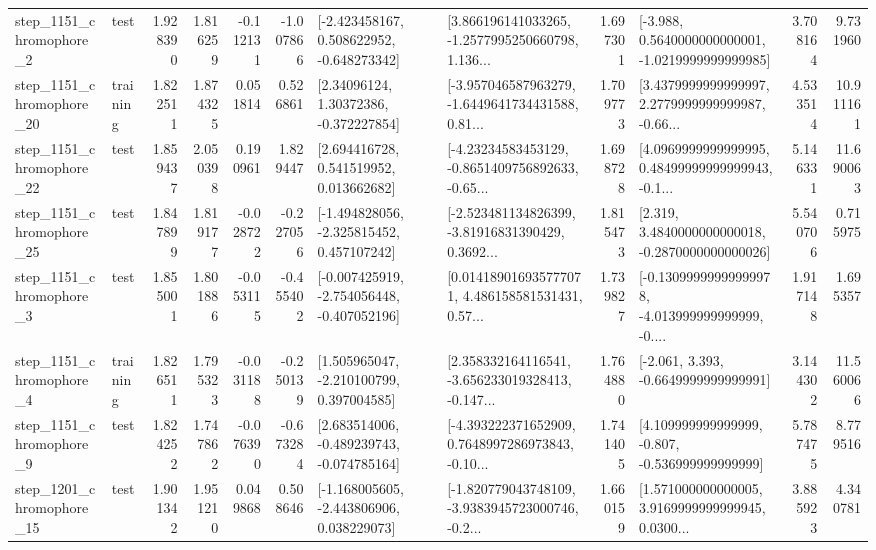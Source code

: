 \begin{tabular}{llrrrrllrlrr}
  step\_1151\_chromophore\_2 &      test &      1.928390 &    1.816259 &     -0.112131 & -1.007866 &   [-2.423458167, 0.508622952, -0.648273342] &  [3.866196141033265, -1.2577995250660798, 1.136... &       1.697301 &  [-3.988, 0.5640000000000001, -1.0219999999999985] &            3.708164 &          9.731960 \\
 step\_1151\_chromophore\_20 &  training &      1.822511 &    1.874325 &      0.051814 &  0.526861 &      [2.34096124, 1.30372386, -0.372227854] &  [-3.957046587963279, -1.6449641734431588, 0.81... &       1.709773 &  [3.4379999999999997, 2.2779999999999987, -0.66... &            4.533514 &         10.911161 \\
 step\_1151\_chromophore\_22 &      test &      1.859437 &    2.050398 &      0.190961 &  1.829447 &     [2.694416728, 0.541519952, 0.013662682] &  [-4.23234583453129, -0.8651409756892633, -0.65... &       1.698728 &  [4.0969999999999995, 0.48499999999999943, -0.1... &            5.146331 &         11.690063 \\
 step\_1151\_chromophore\_25 &      test &      1.847899 &    1.819177 &     -0.028722 & -0.227056 &   [-1.494828056, -2.325815452, 0.457107242] &  [-2.523481134826399, -3.81916831390429, 0.3692... &       1.815473 &   [2.319, 3.4840000000000018, -0.2870000000000026] &            5.540706 &          0.715975 \\
  step\_1151\_chromophore\_3 &      test &      1.855001 &    1.801886 &     -0.053115 & -0.455402 &  [-0.007425919, -2.754056448, -0.407052196] &  [0.014189016935777071, 4.486158581531431, 0.57... &       1.739827 &  [-0.13099999999999978, -4.013999999999999, -0.... &            1.917148 &          1.695357 \\
  step\_1151\_chromophore\_4 &  training &      1.826511 &    1.795323 &     -0.031188 & -0.250139 &    [1.505965047, -2.210100799, 0.397004585] &  [2.358332164116541, -3.656233019328413, -0.147... &       1.764880 &               [-2.061, 3.393, -0.6649999999999991] &            3.144302 &         11.560066 \\
  step\_1151\_chromophore\_9 &      test &      1.824252 &    1.747862 &     -0.076390 & -0.673284 &   [2.683514006, -0.489239743, -0.074785164] &  [-4.393222371652909, 0.7648997286973843, -0.10... &       1.741405 &    [4.109999999999999, -0.807, -0.536999999999999] &            5.787475 &          8.779516 \\
 step\_1201\_chromophore\_15 &      test &      1.901342 &    1.951210 &      0.049868 &  0.508646 &   [-1.168005605, -2.443806906, 0.038229073] &  [-1.820779043748109, -3.9383945723000746, -0.2... &       1.660159 &  [1.571000000000005, 3.9169999999999945, 0.0300... &            3.885923 &          4.340781 \\

\end{tabular}
